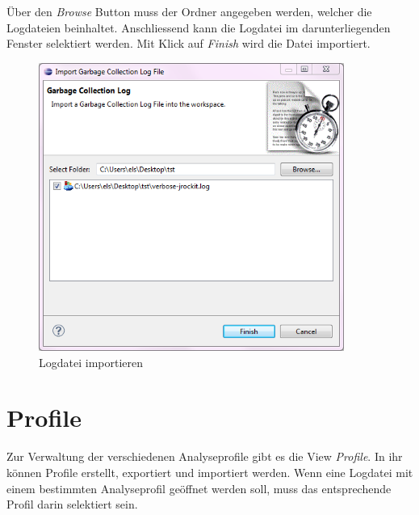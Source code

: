 Über den \textit{Browse} Button muss der Ordner angegeben werden, welcher die Logdateien beinhaltet. Anschliessend kann die Logdatei im darunterliegenden Fenster selektiert werden. Mit Klick auf \textit{Finish} wird die Datei importiert.
 \begin{figure}[H]
  	\centering
    	\includegraphics[width=10cm]{images/tutorial_importlog}
        	\caption{Logdatei importieren}
\end{figure}

\section{Profile}
Zur Verwaltung der verschiedenen Analyseprofile gibt es die View \textit{Profile}. In ihr können Profile erstellt, exportiert und importiert werden. Wenn eine Logdatei mit einem bestimmten Analyseprofil geöffnet werden soll, muss das entsprechende Profil darin selektiert sein.

